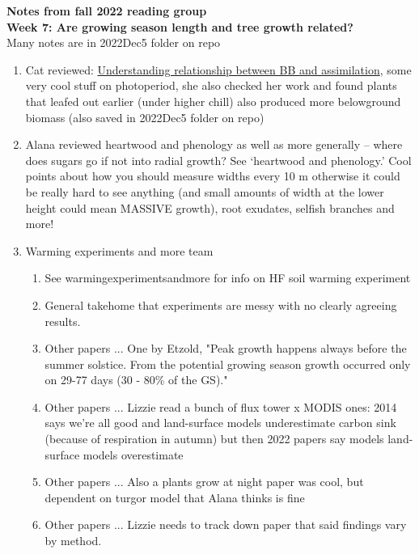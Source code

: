 \documentclass[11pt,letter]{article}
\begin{document}

\renewcommand{\refname}{\CHead{}}

{\bf \large Notes from fall 2022 reading group}\\


{\bf Week 7: Are growing season length and tree growth related?}\\

Many notes are in 2022Dec5 folder on repo

\begin{enumerate}
\item Cat reviewed: \href{https://docs.google.com/document/d/1Fb_Fe9HC4qS44Sjc47Oxm-cfjiXlvITXNps9bB4lK2g/edit}{Understanding relationship between BB and assimilation}, some very cool stuff on photoperiod, she also checked her work and found plants that leafed out earlier (under higher chill) also produced more belowground biomass (also saved in 2022Dec5 folder on repo)
\item Alana reviewed heartwood and phenology as well as more generally -- where does sugars go if not into radial growth? See `heartwood and phenology.' Cool points about how you should measure widths every 10 m otherwise it could be really hard to see anything (and small amounts of width at the lower height could mean MASSIVE growth), root exudates, selfish branches and more!
\item Warming experiments and more team
\begin{enumerate}
\item See warmingexperimentsandmore for info on HF soil warming experiment
\item General takehome that experiments are messy with no clearly agreeing results. 
\item Other papers ... One by Etzold, "Peak growth happens always before the summer solstice.
From the potential growing season growth occurred only on 29-77 days (30 - 80\% of the GS)."
\item Other papers ... Lizzie read a bunch of flux tower x MODIS ones: 2014 says we're all good and land-surface models underestimate carbon sink (because of respiration in autumn) but then 2022 papers say models land-surface models overestimate 
\item Other papers ... Also a plants grow at night paper was cool, but dependent on turgor model that Alana thinks is fine
\item Other papers ... Lizzie needs to track down paper that said findings vary by method. 

\end{enumerate}
\end{enumerate}
\end{document}
